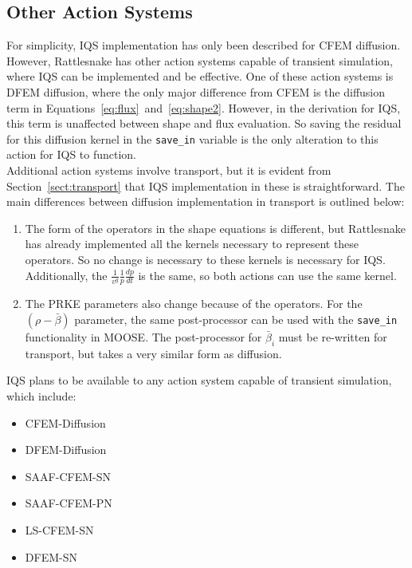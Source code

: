 \documentclass[12pt]{scrartcl}
\newcommand{\sct}[1]{Section~\ref{#1}}                   %
\begin{document}
\subsection{Other Action Systems}

For simplicity, IQS implementation has only been described for CFEM diffusion.  However, Rattlesnake has other action systems capable of transient simulation, where IQS can be implemented and be effective.  One of these action systems is DFEM diffusion, where the only major difference from CFEM is the diffusion term in Equations~\ref{eq:flux}~and~\ref{eq:shape2}.  However, in the derivation for IQS, this term is unaffected between shape and flux evaluation.  So saving the residual for this diffusion kernel in the \texttt{save\_in} variable is the only alteration to this action for IQS to function.\\

Additional action systems involve transport, but it is evident from \sct{sect:transport} that IQS implementation in these is straightforward.  The main differences between diffusion implementation in transport is outlined below:
\begin{enumerate}
\item The form of the operators in the shape equations is different, but Rattlesnake has already implemented all the kernels necessary to represent these operators.  So no change is necessary to these kernels is necessary for IQS.  Additionally, the $\frac{1}{v^g}\frac{1}{p}\frac{dp}{dt}$ is the same, so both actions can use the same kernel.
\item The PRKE parameters also change because of the operators.  For the $(\rho-\bar{\beta})$ parameter, the same post-processor can be used with the \texttt{save\_in} functionality in MOOSE.  The post-processor for $\bar{\beta}_i$ must be re-written for transport, but takes a very similar form as diffusion.
\end{enumerate}

IQS plans to be available to any action system capable of transient simulation, which include:
\begin{itemize}
\item CFEM-Diffusion
\item DFEM-Diffusion
\item SAAF-CFEM-SN
\item SAAF-CFEM-PN
\item LS-CFEM-SN
\item DFEM-SN
\end{itemize}
\end{document}
